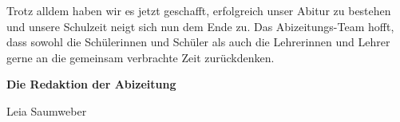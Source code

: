 {Trotz alldem haben wir es jetzt geschafft, erfolgreich unser Abitur zu bestehen und unsere Schulzeit neigt sich nun dem Ende zu.  Das Abizeitungs-Team hofft, dass sowohl die Schülerinnen und Schüler als auch die Lehrerinnen und Lehrer gerne an die gemeinsam verbrachte Zeit zurückdenken.

\begin{center}
\textbf{Die Redaktion der Abizeitung}
\end{center}
}

\null\hfill Leia Saumweber
